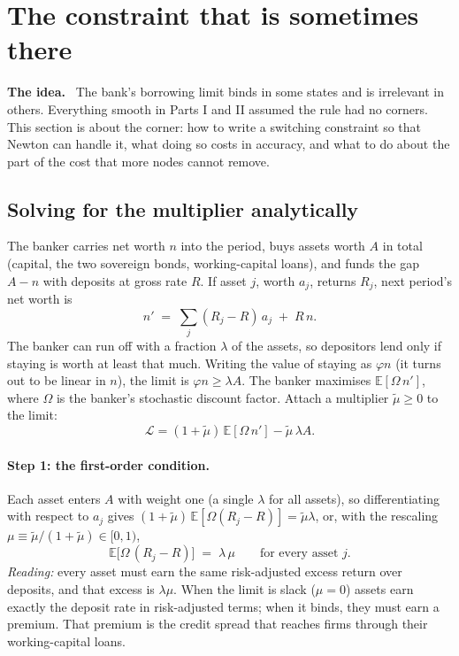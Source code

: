 \documentclass[10pt,a4paper]{article}
\newenvironment{idea}{\begin{shaded}\noindent\textbf{The idea.}\ }{\end{shaded}}
\theoremstyle{plain}
\theoremstyle{remark}
\newcommand{\E}{\mathbb{E}}
\begin{document}
\section{The constraint that is sometimes there}
\label{sec:kink}

\begin{idea}
The bank's borrowing limit binds in some states and is irrelevant in others. Everything smooth
in Parts I and II assumed the rule had no corners. This section is about the corner: how to
write a switching constraint so that Newton can handle it, what doing so costs in accuracy, and
what to do about the part of the cost that more nodes cannot remove.
\end{idea}

\subsection{Solving for the multiplier analytically}

The banker carries net worth $n$ into the period, buys assets worth $A$ in total (capital,
the two sovereign bonds, working-capital loans), and funds the gap $A-n$ with deposits at gross
rate $R$. If asset $j$, worth $a_j$, returns $R_j$, next period's net worth is
\begin{equation}
  n' \;=\; \sum_j (R_j - R)\,a_j \;+\; R\,n .
\end{equation}
The banker can run off with a fraction $\lambda$ of the assets, so depositors lend only if staying
is worth at least that much. Writing the value of staying as $\varphi n$ (it turns out to be
linear in $n$), the limit is $\varphi n \ge \lambda A$. The banker maximises $\E[\Omega\,n']$,
where $\Omega$ is the banker's stochastic discount factor. Attach a multiplier
$\tilde\mu\ge0$ to the limit:
\begin{equation}
  \mathcal{L} = (1+\tilde\mu)\,\E[\Omega\,n'] - \tilde\mu\,\lambda A .
\end{equation}

\paragraph{Step 1: the first-order condition.} Each asset enters $A$ with weight one (a single
$\lambda$ for all assets), so differentiating with respect to $a_j$ gives
$(1+\tilde\mu)\,\E[\Omega(R_j-R)] = \tilde\mu\lambda$, or, with the rescaling
$\mu \equiv \tilde\mu/(1+\tilde\mu)\in[0,1)$,
\begin{equation}
  \E\big[\Omega\,(R_j - R)\big] \;=\; \lambda\,\mu \qquad\text{for every asset } j.
  \label{eq:foc}
\end{equation}
\emph{Reading:} every asset must earn the same risk-adjusted excess return over deposits, and that
excess is $\lambda\mu$. When the limit is slack ($\mu=0$) assets earn exactly the deposit rate in
risk-adjusted terms; when it binds, they must earn a premium. That premium is the credit spread that
reaches firms through their working-capital loans.
\end{document}
